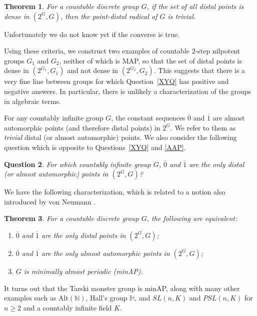 \documentclass[11pt]{amsart}
\newtheorem{theorem}{Theorem}[section]
\newtheorem{question}[theorem]{Question}
\theoremstyle{definition}
\numberwithin{equation}{section}
\theoremstyle{definition}
\begin{document}
\begin{theorem}\label{thm:main3} For a countable discrete group $G$, if the set of all distal points is dense in $(2^G, G)$, then the point-distal radical of $G$ is trivial.
\end{theorem}

Unfortunately we do not know yet if the converse is true. 

Using these criteria, we construct two examples of countable $2$-step nilpotent groups $G_1$ and $G_2$, neither of which is MAP, so that the set of distal points is dense in $(2^{G_1}, G_1)$ and not dense in $(2^{G_2}, G_2)$. This suggests that there is a very fine line between groups for which Question~\ref{XYQ} has positive and negative answers. In particular, there is unlikely a characterization of the groups in algebraic terms.

For any countably infinite group $G$, the constant sequences $\overline{0}$ and $\overline{1}$ are almost automorphic points (and therefore distal points) in  $2^G$. We refer to them as {\em trivial} distal (or almost automorphic) points. We also consider the following question which is opposite to Questions~\ref{XYQ} and \ref{AAP}.

\begin{question}\label{Trivial} For which countably infinite group $G$, $\overline{0}$ and $\overline{1}$ are the only distal (or almost automorphic) points in $(2^G, G)$?
\end{question}

We have the following characterization, which is related to a notion also introduced by von Neumann \cite{vN}.

\begin{theorem}\label{thm:main4} For a countable discrete group $G$, the following are equivalent:
\begin{enumerate}
\item $\overline{0}$ and $\overline{1}$ are the only distal points in $(2^G, G)$;
\item $\overline{0}$ and $\overline{1}$ are the only almost automorphic points in $(2^G, G)$;
\item $G$ is minimally almost periodic (minAP).
\end{enumerate}
\end{theorem}

It turns out that the Tarski monster group is minAP, along with many other examples such as $\mbox{Alt}(\mathbb{N})$, Hall's group $\mathbb{H}$, and $SL(n,K)$ and $PSL(n, K)$ for $n\geq 2$ and a countably infinite field $K$. 
\end{document}
